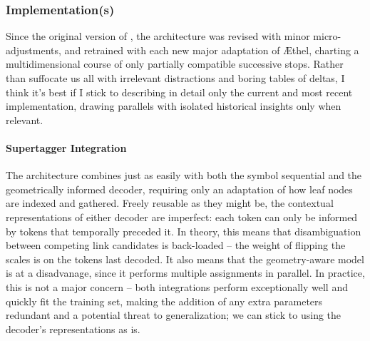 \subsubsection{Implementation(s)}
Since the original version of \citet{kogkalidis-etal-2020-neural}, the architecture was revised with minor micro-adjustments, and retrained with each new major adaptation of \AE thel, charting a multidimensional course of only partially compatible successive stops.
Rather than suffocate us all with irrelevant distractions and boring tables of deltas, I think it's best if I stick to describing in detail only the current and most recent implementation, drawing parallels with isolated historical insights only when relevant.

\paragraph{Supertagger Integration}
The architecture combines just as easily with both the symbol sequential and the geometrically informed decoder, requiring only an adaptation of how leaf nodes are indexed and gathered.
Freely reusable as they might be, the contextual representations of either decoder are imperfect: each token can only be informed by tokens that temporally preceded it.
In theory, this means that disambiguation between competing link candidates is back-loaded -- the weight of flipping the scales is on the tokens last decoded. 
It also means that the geometry-aware model is at a disadvanage, since it performs multiple assignments in parallel.
In practice, this is not a major concern -- both integrations perform exceptionally well and quickly fit the training set, making the addition of any extra parameters redundant and a potential threat to generalization; we can stick to using the decoder's representations as is.

